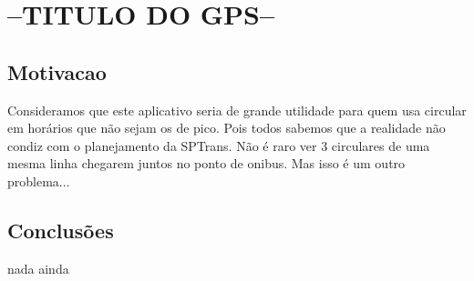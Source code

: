 \section{--TITULO DO GPS--}

\subsection{Motivacao}
Consideramos que este aplicativo seria de grande utilidade para quem usa
circular em horários que não sejam os de pico. Pois todos sabemos que a
realidade não condiz com o planejamento da SPTrans. Não é raro ver
3 circulares de uma mesma linha chegarem juntos no ponto de onibus. Mas
isso é um outro problema...

\subsection{Conclusões}
nada ainda
